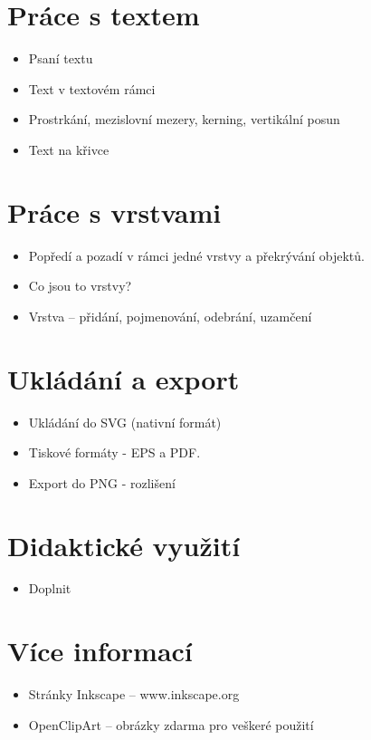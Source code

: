 \documentclass[12pt,a4paper]{article}
\begin{document}
\section{Práce s textem}
	
\begin{itemize}
		\item Psaní textu
		\item Text v textovém rámci
		\item Prostrkání, mezislovní mezery, kerning, vertikální posun
		\item Text na křivce
\end{itemize}	

\section{Práce s vrstvami}
\begin{itemize}
	\item Popředí a pozadí v rámci jedné vrstvy a překrývání objektů.
	\item Co jsou to vrstvy?
	\item Vrstva -- přidání, pojmenování, odebrání, uzamčení
\end{itemize}	

\section{Ukládání a export}
\begin{itemize}
	\item Ukládání do SVG (nativní formát)
	\item Tiskové formáty - EPS a PDF.
	\item Export do PNG - rozlišení
\end{itemize}

\section{Didaktické využití}
	
\begin{itemize}
	\item Doplnit

\end{itemize}	

\section{Více informací}
\begin{itemize}
	\item Stránky Inkscape -- www.inkscape.org
	\item OpenClipArt -- obrázky zdarma pro veškeré použití
\end{itemize}
\end{document}
